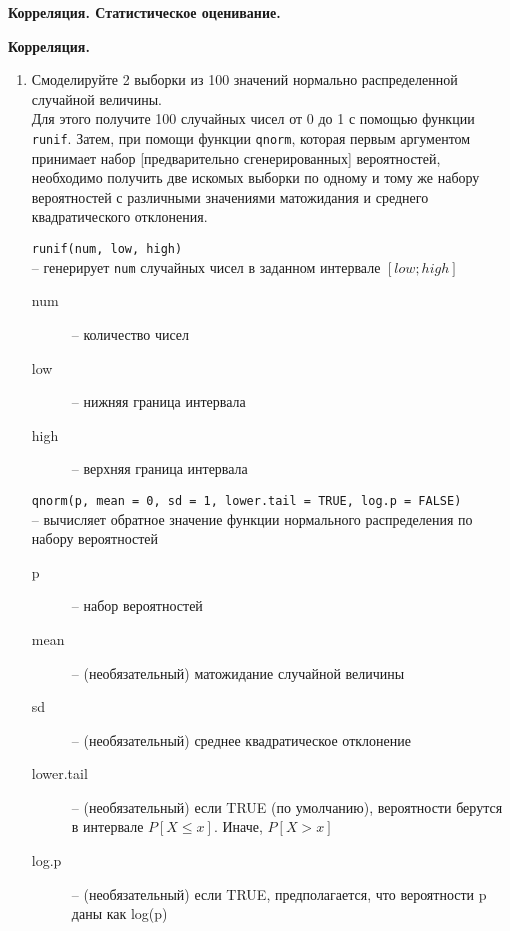 
\textbf{\large Корреляция. Статистическое оценивание.}

\textbf{Корреляция.}

\begin{enumerate}

    \item Смоделируйте 2 выборки из 100 значений нормально распределенной случайной величины. \\
          Для этого получите 100 случайных чисел от 0 до 1 с помощью функции \texttt{runif}.
          Затем, при помощи функции \texttt{qnorm}, которая первым аргументом принимает 
          набор [предварительно сгенерированных] вероятностей, необходимо получить две искомых выборки
          по одному и тому же набору вероятностей с различными значениями матожидания и среднего 
          квадратического отклонения.

          \begin{mdframed}[style=BadassFrame]

              \texttt{runif(num, low, high)} \\-- генерирует \texttt{num} случайных чисел в заданном интервале $[low; high]$  
              \begin{description}

                \item[num] -- количество чисел
                \item[low] -- нижняя граница интервала
                \item[high] -- верхняя граница интервала
              \end{description}
          \end{mdframed}

          \begin{mdframed}[style=BadassFrame]

              \texttt{qnorm(p, mean = 0, sd = 1, lower.tail = TRUE, log.p = FALSE)} \\
                -- вычисляет обратное значение функции нормального распределения по набору вероятностей
              \begin{description}

                \item[p] -- набор вероятностей
                \item[mean] -- (необязательный) матожидание случайной величины
                \item[sd] -- (необязательный) среднее квадратическое отклонение
                \item[lower.tail] -- (необязательный) если TRUE (по умолчанию), вероятности берутся в интервале $P[X \leq x]$. Иначе, $P[X > x]$ 
                \item[log.p] -- (необязательный) если TRUE, предполагается, что вероятности p даны как log(p)
              \end{description}
          \end{mdframed}


\end{enumerate}
